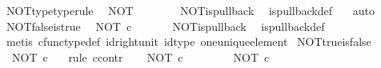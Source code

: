 \begin{isabellebody}
\ NOT{\isacharunderscore}{\kern0pt}type{\isacharbrackleft}{\kern0pt}type{\isacharunderscore}{\kern0pt}rule{\isacharbrackright}{\kern0pt}{\isacharcolon}{\kern0pt}\isanewline
\ \ {\isachardoublequoteopen}NOT\ {\isacharcolon}{\kern0pt}\ {\isasymOmega}\ {\isasymrightarrow}\ {\isasymOmega}{\isachardoublequoteclose}\isanewline
%
\isadelimproof
\ \ %
\endisadelimproof
%
\isatagproof
{}\isamarkupfalse%
\ NOT{\isacharunderscore}{\kern0pt}is{\isacharunderscore}{\kern0pt}pullback\ \isamarkupfalse%
\ is{\isacharunderscore}{\kern0pt}pullback{\isacharunderscore}{\kern0pt}def\ \ \isamarkupfalse%
\ auto%
\endisatagproof
{\isafoldproof}%
%
\isadelimproof
\isanewline
%
\endisadelimproof
\isanewline
{}\isamarkupfalse%
\ NOT{\isacharunderscore}{\kern0pt}false{\isacharunderscore}{\kern0pt}is{\isacharunderscore}{\kern0pt}true{\isacharcolon}{\kern0pt}\isanewline
\ \ {\isachardoublequoteopen}NOT\ {\isasymcirc}\isactrlsub c\ {\isasymf}\ {\isacharequal}{\kern0pt}\ {\isasymt}{\isachardoublequoteclose}\isanewline
%
\isadelimproof
\ \ %
\endisadelimproof
%
\isatagproof
{}\isamarkupfalse%
\ NOT{\isacharunderscore}{\kern0pt}is{\isacharunderscore}{\kern0pt}pullback\ \isamarkupfalse%
\ is{\isacharunderscore}{\kern0pt}pullback{\isacharunderscore}{\kern0pt}def\ \isanewline
\ \ \isamarkupfalse%
\ {\isacharparenleft}{\kern0pt}metis\ cfunc{\isacharunderscore}{\kern0pt}type{\isacharunderscore}{\kern0pt}def\ id{\isacharunderscore}{\kern0pt}right{\isacharunderscore}{\kern0pt}unit\ id{\isacharunderscore}{\kern0pt}type\ one{\isacharunderscore}{\kern0pt}unique{\isacharunderscore}{\kern0pt}element{\isacharparenright}{\kern0pt}%
\endisatagproof
{\isafoldproof}%
%
\isadelimproof
\isanewline
%
\endisadelimproof
\isanewline
{}\isamarkupfalse%
\ NOT{\isacharunderscore}{\kern0pt}true{\isacharunderscore}{\kern0pt}is{\isacharunderscore}{\kern0pt}false{\isacharcolon}{\kern0pt}\isanewline
\ \ {\isachardoublequoteopen}NOT\ {\isasymcirc}\isactrlsub c\ {\isasymt}\ {\isacharequal}{\kern0pt}\ {\isasymf}{\isachardoublequoteclose}\isanewline
%
\isadelimproof
%
\endisadelimproof
%
\isatagproof
{}\isamarkupfalse%
{\isacharparenleft}{\kern0pt}rule\ ccontr{\isacharparenright}{\kern0pt}\isanewline
\ \ \isamarkupfalse%
\ {\isachardoublequoteopen}NOT\ {\isasymcirc}\isactrlsub c\ {\isasymt}\ {\isasymnoteq}\ {\isasymf}{\isachardoublequoteclose}\isanewline
\ \ \isamarkupfalse%
\ \isamarkupfalse%
\ {\isachardoublequoteopen}NOT\ {\isasymcirc}\isactrlsub c\ {\isasymt}\ {\isacharequal}{\kern0pt}\ {\isasymt}{\isachardoublequoteclose}\isanewline

\end{isabellebody}
